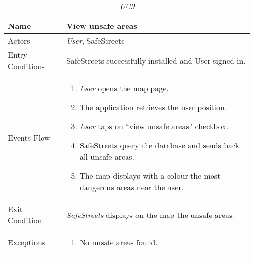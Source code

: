 \documentclass[../../../RASD.tex]{subfiles}
\begin{document}
    \begin{center}
        \begin{longtable}{| p{.35\linewidth} | p{.65\linewidth} |}
            \hline
            \textbf{Name} & \textbf{View unsafe areas}\\ \hline
            Actors & \textit{User}, SafeStreets\\ \hline
            Entry Conditions & SafeStreets successfully installed and User signed in.\\ \hline
            Events Flow &
            \begin{enumerate}
                \item \textit{User} opens the map page.
                \item  The application retrieves the user position.
                \item \textit{User} taps on “view unsafe areas” checkbox.
                \item  SafeStreets query the database and sends back all unsafe areas.
                \item The map displays with a colour the most dangerous areas near the user.
            \end{enumerate}
            \\ \hline
            Exit Condition & \textit{SafeStreets} displays on the map the unsafe areas.\\ \hline
            Exceptions &
            \begin{enumerate}
                \item No unsafe areas found.
            \end{enumerate}
            \\
            \hline
            \caption[\textit{Use Case 9}]{\textit{UC9}}
        \end{longtable}
    \end{center}
    \newpage
\end{document}
